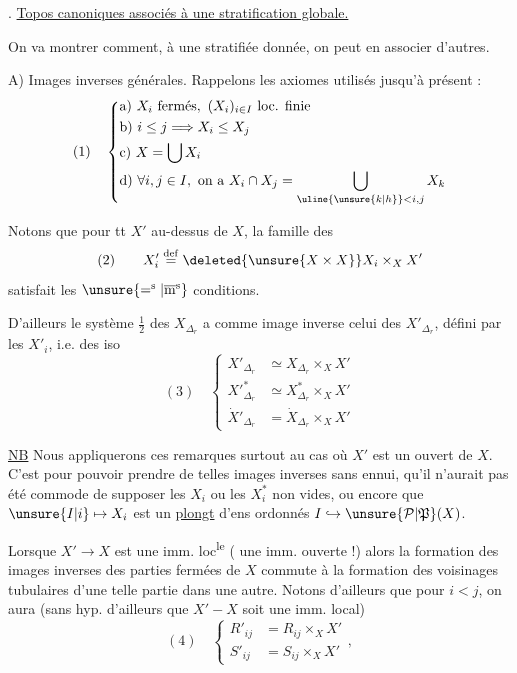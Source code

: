 . \uline{Topos canoniques associés à une stratification globale.}

On va montrer comment, à une  stratifiée donnée, on peut en associer d'autres.

A) Images inverses générales. Rappelons les axiomes utilisés jusqu'à présent :
\[
(1)\quad\left\{\begin{aligned}
&\text{a) }X_i\text{ fermés},\ (X_i)_{i\in I}\text{ loc. finie}\\
&\text{b) }i\leq j\Longrightarrow X_i\leq X_j\\
&\text{c) }X=\bigcup X_i\\
&\text{d) }\forall i,j\in I,\text{ on a }X_i\cap X_j=\bigcup_{\uline{\unsure{k|h}}<i,j}X_k
\end{aligned}\right.
\]

Notons que pour tt $X'$ au-dessus de $X$, la famille des
\[
(2)\qquad X'_i\overset{\mathrm{def}}=\deleted{\unsure{X\times X}}X_i\times_X X'
\]
satisfait les $\unsure{=^{\mathrm s}|\overline{\mathrm m}^{\mathrm s}}$ conditions.

D'ailleurs le système $\frac12$  des $X_{\Delta_r}$ a comme image inverse celui des $X'_{\Delta_r}$, défini par les $X'_i$,  i.e. des iso
\[
(3)\quad\left\{\begin{aligned}
X'_{\Delta_r}&\simeq X_{\Delta_r}\times_X X'\\
X'^{*}_{\Delta_r}&\simeq X^*_{\Delta_r}\times_X X'\\
\dot X'_{\Delta_r}&=\dot X_{\Delta_r}\times_X X'
\end{aligned}\right.
\]

\uline{NB} Nous appliquerons ces remarques surtout au cas où $X'$ est un ouvert de $X$. C'est pour pouvoir prendre de telles images inverses sans ennui, qu'il n'aurait pas été commode de supposer les $X_i$ ou les $X_i^*$ non vides, ou encore que $\unsure{I|i}\mapsto X_i$ est un \uline{plongt} d'ens ordonnés $I\hookrightarrow\unsure{\mathcal P|\mathfrak P}(X)$.

Lorsque $X'\to X$ est une imm. loc\textsuperscript{le}     ( une imm. ouverte !) alors la formation des images inverses des parties  fermées de $X$ commute à la formation des voisinages tubulaires d'une telle partie dans une autre. Notons d'ailleurs que pour $i<j$, on aura (sans hyp. d'ailleurs que $X'-X$ soit une imm. local)
\[
(4)\quad\left\{\begin{aligned}
R'_{ij}&=R_{ij}\times_X X'\\
S'_{ij}&=S_{ij}\times_X X'
\end{aligned}\right.,
\]

